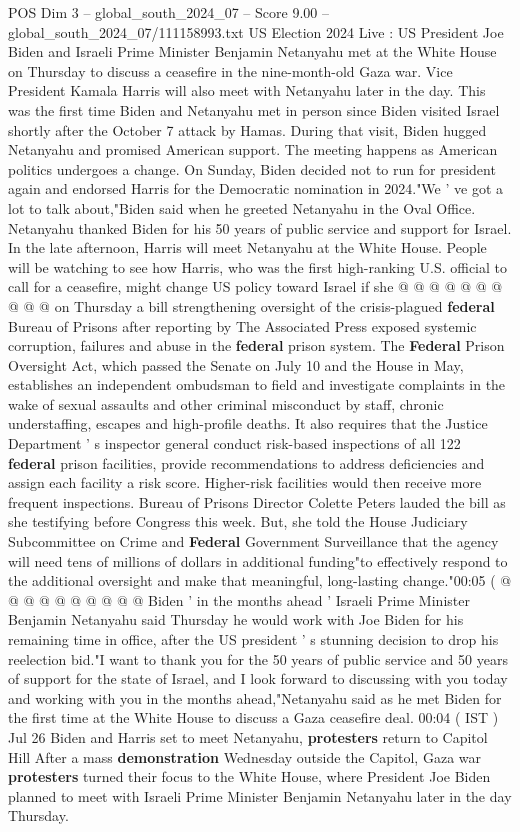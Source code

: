 \begin{textsample}{POS Dim 3 – global\_south\_2024\_07 – Score 9.00 – global\_south\_2024\_07/111158993.txt}  \label{ex:f3_pos_313}
US Election 2024 Live : US President Joe Biden and Israeli Prime Minister Benjamin Netanyahu met at the White House on Thursday to discuss a ceasefire in the nine-month-old Gaza war.
Vice President Kamala Harris will also meet with Netanyahu later in the day.
This was the first time Biden and Netanyahu met in person since Biden visited Israel shortly after the October 7 attack by Hamas.
During that visit, Biden hugged Netanyahu and promised American support.
The meeting happens as American politics undergoes a change.
On Sunday, Biden decided not to run for president again and endorsed Harris for the Democratic nomination in 2024."We ' ve got a lot to talk about,"Biden said when he greeted Netanyahu in the Oval Office.
Netanyahu thanked Biden for his 50 years of public service and support for Israel.
In the late afternoon, Harris will meet Netanyahu at the White House.
People will be watching to see how Harris, who was the first high-ranking U.S. official to call for a ceasefire, might change US policy toward Israel if she @ @ @ @ @ @ @ @ @ @ on Thursday a bill strengthening oversight of the crisis-plagued \textbf{federal} Bureau of Prisons after reporting by The Associated Press exposed systemic corruption, failures and abuse in the \textbf{federal} prison system.
The \textbf{Federal} Prison Oversight Act, which passed the Senate on July 10 and the House in May, establishes an independent ombudsman to field and investigate complaints in the wake of sexual assaults and other criminal misconduct by staff, chronic understaffing, escapes and high-profile deaths.
It also requires that the Justice Department ' s inspector general conduct risk-based inspections of all 122 \textbf{federal} prison facilities, provide recommendations to address deficiencies and assign each facility a risk score.
Higher-risk facilities would then receive more frequent inspections.
Bureau of Prisons Director Colette Peters lauded the bill as she testifying before Congress this week.
But, she told the House Judiciary Subcommittee on Crime and \textbf{Federal} Government Surveillance that the agency will need tens of millions of dollars in additional funding"to effectively respond to the additional oversight and make that meaningful, long-lasting change."00:05 ( @ @ @ @ @ @ @ @ @ @ Biden ' in the months ahead ' Israeli Prime Minister Benjamin Netanyahu said Thursday he would work with Joe Biden for his remaining time in office, after the US president ' s stunning decision to drop his reelection bid."I want to thank you for the 50 years of public service and 50 years of support for the state of Israel, and I look forward to discussing with you today and working with you in the months ahead,"Netanyahu said as he met Biden for the first time at the White House to discuss a Gaza ceasefire deal. 00:04 ( IST ) Jul 26 Biden and Harris set to meet Netanyahu, \textbf{protesters} return to Capitol Hill After a mass \textbf{demonstration} Wednesday outside the Capitol, Gaza war \textbf{protesters} turned their focus to the White House, where President Joe Biden planned to meet with Israeli Prime Minister Benjamin Netanyahu later in the day Thursday.

\end{textsample}
